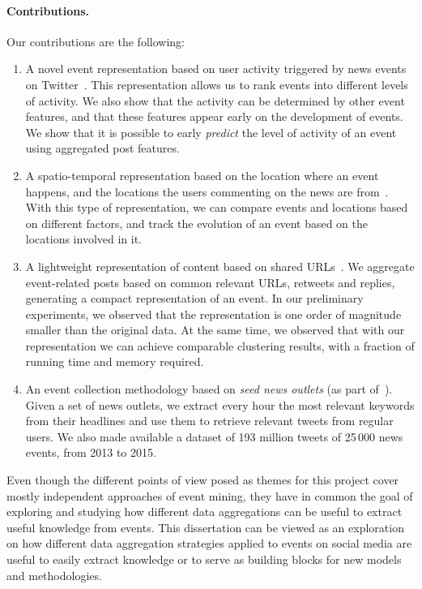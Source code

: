 \documentclass[runningheads]{llncs}
\begin{document}
\paragraph{Contributions.} Our contributions are the following:

\begin{enumerate}
\item A novel event representation based on user activity triggered by news
events on Twitter~\cite{kalyanam2016prediction}.
%
This representation allows us to rank events into different levels of activity. 
%
We also show that the activity can be determined by other event features, and
that these features appear early on the development of events.
%
We show that it is possible to early {\em predict} the level of activity of an
event using aggregated post features.

\item A spatio-temporal representation based on the location where an event
happens, and the locations the users commenting on the news are
from~\cite{pena2017gaining}.
%
With this type of representation, we can compare events and locations based on
different factors, and track the evolution of an event based on the locations
involved in it.

\item A lightweight representation of content based on shared
URLs~\cite{urlmodel}.
%
We aggregate event-related posts based on common relevant URLs, retweets and
replies, generating a compact representation of an event.
%
In our preliminary experiments, we observed that the representation is one order
of magnitude smaller than the original data.
%
At the same time, we observed that with our representation we can achieve
comparable clustering results, with a fraction of running time and memory
required.

\item An event collection methodology based on {\em seed news outlets} (as part
of~\cite{kalyanam2016prediction}).
%
Given a set of news outlets, we extract every hour the most relevant keywords
from their headlines and use them to retrieve relevant tweets from regular
users.
%
We also made available a dataset of 193 million tweets of 25\,000 news events,
from 2013 to 2015.
\end{enumerate}

Even though the different points of view posed as themes for this project cover
mostly independent approaches of event mining, they have in common the goal of
exploring and studying how different data aggregations can be useful to extract
useful knowledge from events. 
%
This dissertation can be viewed as an exploration on how different data
aggregation strategies applied to events on social media are useful to easily
extract knowledge or to serve as building blocks for new models and
methodologies.



    

%
%
%
 
 
%
\end{document}
